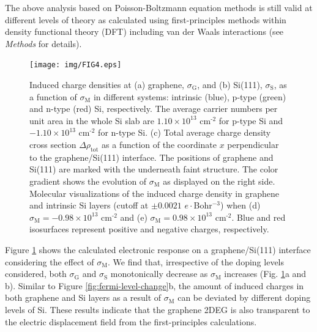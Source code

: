 \documentclass[journal=nalefd]{achemso}
\newcommand*\subs[1]{_{\text{#1}}} %
\newcommand*\sups[1]{^{\text{#1}}} %
\begin{document}
The above analysis based on Poisson-Boltzmann equation methods is still valid at different levels of theory as calculated using first-principles methods within density functional theory (DFT) including 
van der Waals interactions (see {\it Methods} for details). 
\begin{figure}[htbp]
  \texttt{[image: img/FIG4.eps]}
  \caption{Induced charge densities at (a) graphene, $\sigma\subs{G}$, and (b) Si(111), $\sigma\subs{S}$, as a function of $\sigma\subs{M}$ in different systems: intrinsic (blue), p-type (green)  and n-type (red) Si, respectively.
  The average carrier numbers per unit area in the whole Si slab are $1.10\times10^{13}$ cm$\sups{-2}$ for p-type Si and $-1.10\times10^{13}$ cm$\sups{-2}$ for n-type Si. 
  (c) Total average charge density cross 
  section $\Delta \rho\subs{tot}$
  as a function of the coordinate $x$ perpendicular to the graphene/Si(111) interface. 
  The positions of graphene and Si(111) are marked with the underneath faint structure. 
  The color gradient shows the evolution of $\sigma\subs{M}$ as displayed on the right side. Molecular visualizations of the induced charge density in graphene and intrinsic Si layers
  (cutoff at $\pm 0.0021$ $e\cdot$Bohr$^{-3}$) when (d) $\sigma\subs{M}=-0.98\times10^{13}$ cm$\sups{-2}$ and (e) $\sigma\subs{M}=0.98\times10^{13}$ cm$\sups{-2}$. 
  Blue and red isosurfaces represent positive and negative charges, respectively.
  }
  \label{fig:first principle}
\end{figure}
Figure \ref{fig:first principle} shows the calculated electronic response on a graphene/Si(111) interface considering the effect of $\sigma\subs{M}$. 
We find that, irrespective of the doping levels considered, both $\sigma\subs{G}$ and $\sigma\subs{S}$ monotonically decrease as $\sigma\subs{M}$ increases (Fig. \ref{fig:first principle}a and b).
Similar to Figure \ref{fig:fermi-level-change}b, the amount of induced charges in both graphene and Si layers as a result of $\sigma\subs{M}$ can be deviated by different doping levels of Si.
These results indicate that the graphene 2DEG is also transparent to the electric displacement field from the first-principles calculations.
\end{document}
